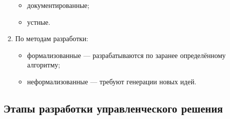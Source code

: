 \documentclass[12pt, russian, oneside, article]{ncc}
\begin{document}
\begin{enumerate}
\begin{itemize}
\item документированные;
\item устные.
\end{itemize}

\item По методам разработки:

\begin{itemize}
\item формализованные --- разрабатываются по заранее определённому алгоритму;
\item неформализованные --- требуют генерации новых идей.
\end{itemize}

\end{enumerate}
\subsection{Этапы разработки управленческого решения}
\label{sec-6_2}
\end{document}
